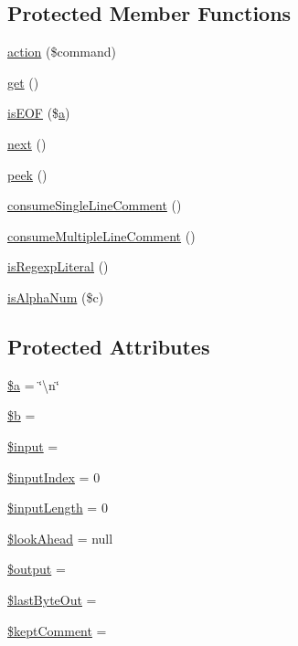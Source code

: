 \subsection*{Protected Member Functions}
\begin{DoxyCompactItemize}
\item 
\hyperlink{classJSMin_afecad9e791629529f6b379bd7b20a4e4}{action} (\$command)
\item 
\hyperlink{classJSMin_adcd5b6e8efc1792816812168118f49ef}{get} ()
\item 
\hyperlink{classJSMin_a450a0756edbd9508745f90ccacd08a27}{is\+E\+O\+F} (\$\hyperlink{Shape_8php_a868083704107d6d05b69983f62cce171}{a})
\item 
\hyperlink{classJSMin_a3c4b356d81d5e5ede03f43cf2aec9037}{next} ()
\item 
\hyperlink{classJSMin_ac786ee1b9552762de8fbc7a3a1c22070}{peek} ()
\item 
\hyperlink{classJSMin_ad7f3a27d59bdb92db013a336b1c64f3a}{consume\+Single\+Line\+Comment} ()
\item 
\hyperlink{classJSMin_a1bda4db9c558409b8bfc75279a42ca8a}{consume\+Multiple\+Line\+Comment} ()
\item 
\hyperlink{classJSMin_a487b4b073a8319123317d776feb72f6f}{is\+Regexp\+Literal} ()
\item 
\hyperlink{classJSMin_af54ff87064c2b9f19e4905e511fc83e5}{is\+Alpha\+Num} (\$c)
\end{DoxyCompactItemize}
\subsection*{Protected Attributes}
\begin{DoxyCompactItemize}
\item 
\hyperlink{classJSMin_a2386c0978ac70ac8e9bd592fca835e82}{\$a} = \char`\"{}\textbackslash{}n\char`\"{}
\item 
\hyperlink{classJSMin_aafa0d83dd06ede16a81de0441c5eb1ad}{\$b} = \textquotesingle{}\textquotesingle{}
\item 
\hyperlink{classJSMin_afc2d10997a7e61c31cc9ed70e414829b}{\$input} = \textquotesingle{}\textquotesingle{}
\item 
\hyperlink{classJSMin_a4f772e961c1cd23e3baa6486a2952236}{\$input\+Index} = 0
\item 
\hyperlink{classJSMin_adc61bf642369b9d96e4844b2e694cf76}{\$input\+Length} = 0
\item 
\hyperlink{classJSMin_ad78bd58d8c2f93286068d85abc0afb57}{\$look\+Ahead} = null
\item 
\hyperlink{classJSMin_ab1b9cc7015da8bc3e3cc5edbc60f0ac2}{\$output} = \textquotesingle{}\textquotesingle{}
\item 
\hyperlink{classJSMin_aa33e5c3fabce5f410b11880757bd6521}{\$last\+Byte\+Out} = \textquotesingle{}\textquotesingle{}
\item 
\hyperlink{classJSMin_ac9f663a3d896ddbce3262eae7f777e94}{\$kept\+Comment} = \textquotesingle{}\textquotesingle{}
\end{DoxyCompactItemize}



